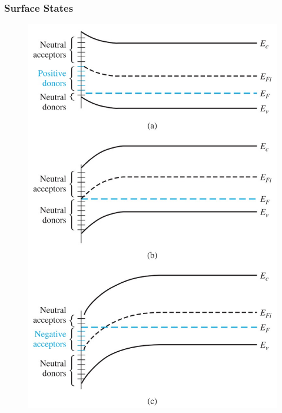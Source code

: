\documentclass{beamer}
\begin{document}
    \begin{frame} \frametitle{Surface States}
        \begin{minipage}{\linewidth}
            \begin{minipage}{0.45\linewidth}
                \begin{figure}[H]
                    \centering
                    \includegraphics[width=\linewidth]{Surface-states-midgap.jpg}
                    \label{fig:Surface-states-midgap.jpg}
                \end{figure}
            \end{minipage}
            \begin{minipage}{0.45\linewidth}
                \begin{figure}[H]

\end{figure}
\end{minipage}
\end{minipage}
\end{frame}
\end{document}
